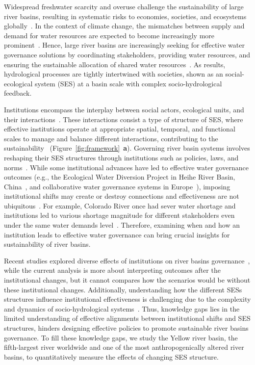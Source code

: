 Widespread freshwater scarcity and overuse challenge the sustainability of large river basins, resulting in systematic risks to economies, societies, and ecosystems globally~\cite{distefano2017, dolan2021, xu2020b, mekonnen2016}.
In the context of climate change, the mismatches between supply and demand for water resources are expected to become increasingly more prominent~\cite{florke2018, yoon2021}.
Hence, large river basins are increasingly seeking for effective water governance solutions by coordinating stakeholders, providing water resources, and ensuring the sustainable allocation of shared water resources~\cite{wang2019d}.
As results, hydrological processes are tightly intertwined with societies, shown as an social-ecological system (SES) at a basin scale with complex socio-hydrological feedback.

Institutions encompass the interplay between social actors, ecological units, and their interactions~\cite{lien2020, bodin2017b, wang2022g}.
These interactions consist a type of structure of SES, where effective institutions operate at appropriate spatial, temporal, and functional scales to manage and balance different interactions, contributing to the sustainability~\cite{epstein2015, wang2019d} (Figure~\ref{fig:framework}~\textbf{a}).
Governing river basin systems involves reshaping their SES structures through institutions such as policies, laws, and norms~\cite{young2008,cumming2020b}.
While some institutional advances have led to effective water governance outcomes (e.g., the Ecological Water Diversion Project in Heihe River Basin, China~\cite{wang2019d}, and collaborative water governance systems in Europe~\cite{green2013}),
imposing institutional shifts may create or destroy connections and effectiveness are not ubiquitous~\cite{loos2022}.
For example, Colorado River once had sever water shortage and institutions led to various shortage magnitude for different stakeholders even under the same water demands level~\cite{hadjimichael2020}.
Therefore, examining when and how an institution leads to effective water governance can bring crucial insights for sustainability of river basins.

Recent studies explored diverse effects of institutions on river basins governance~\cite{bouckaert2022, vallury2022, loch2020, kirchhoff2016}, while the current analysis is more about interpreting outcomes after the institutional changes, but it cannot compares how the scenarios would be without these institutional changes.
Additionally, understanding how the different SESs structures influence institutional effectiveness is challenging due to the complexity and dynamics of socio-hydrological systems~\cite{bodin2017b}.
Thus, knowledge gaps lies in the limited understanding of effective alignments between institutional shifts and SES structures, hinders designing effective policies to promote sustainable river basins governance.
To fill these knowledge gaps, we study the Yellow river basin, the fifth-largest river worldwide and one of the most anthropogenically altered river basins, to quantitatively measure the effects of changing SES structure.

